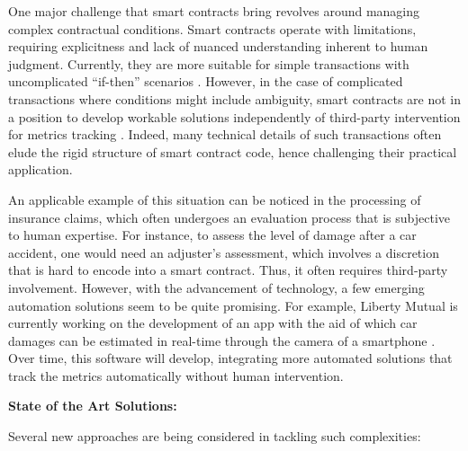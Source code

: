 One major challenge that smart contracts bring revolves around managing complex contractual conditions. Smart contracts operate with limitations, requiring explicitness and lack of nuanced understanding inherent to human judgment. Currently, they are more suitable for simple transactions with uncomplicated ``if-then'' scenarios \cite{Durovic2021}. However, in the case of complicated transactions where conditions might include ambiguity, smart contracts are not in a position to develop workable solutions independently of third-party intervention for metrics tracking \cite{Borselli2020}. Indeed, many technical details of such transactions often elude the rigid structure of smart contract code, hence challenging their practical application.

An applicable example of this situation can be noticed in the processing of insurance claims, which often undergoes an evaluation process that is subjective to human expertise. For instance, to assess the level of damage after a car accident, one would need an adjuster's assessment, which involves a discretion that is hard to encode into a smart contract. Thus, it often requires third-party involvement. However, with the advancement of technology, a few emerging automation solutions seem to be quite promising. For example, Liberty Mutual is currently working on the development of an app with the aid of which car damages can be estimated in real-time through the camera of a smartphone \cite{Borselli2020}. Over time, this software will develop, integrating more automated solutions that track the metrics automatically without human intervention.

\textbf{State of the Art Solutions:}

Several new approaches are being considered in tackling such complexities:

